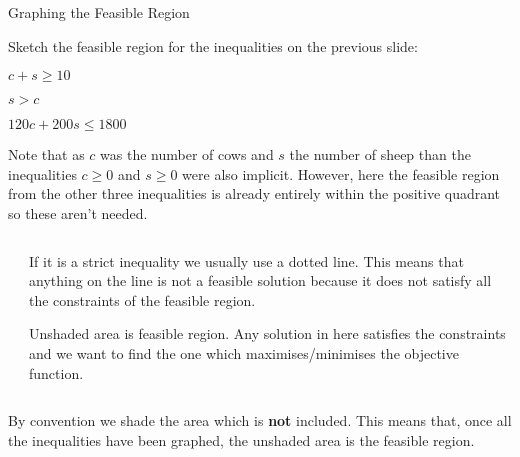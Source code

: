 \documentclass[8pt]{beamer}
\begin{document}
\begin{frame}{Graphing the Feasible Region}
	\begin{problem}
		Sketch the feasible region for the inequalities on the previous slide:
		\begin{minipage}{.3\linewidth}
		$c+s \geq 10$

		 $s > c$

		  $120c+200s \leq 1800$
		\end{minipage}%
		\begin{minipage}{.7\linewidth}
			\alert{Note that as $c$ was the number of cows and $s$ the number of sheep than the inequalities $c \geq 0 $ and $s \geq 0$ were also implicit. However, here the feasible region from the other three inequalities is already entirely within the positive quadrant so these aren't needed.}
		\end{minipage}
	\end{problem}
	\begin{columns}
	\begin{column}{.5\linewidth}
				\begin{center}
\end{center}
\end{column}
\begin{column}{.5\linewidth}
	\alert{If it is a strict inequality we
usually use a dotted line.
This means that anything on
the line is not a feasible
solution because it does not
satisfy all the constraints of
the feasible region.}

Unshaded area is feasible
region. Any solution in here
satisfies the constraints and
we want to find the one
which maximises/minimises
the objective function.
\end{column}
\end{columns}

\begin{definition}
	By convention we shade the area which is \textbf{not} included. This means that, once all the inequalities have been graphed, the unshaded area is the feasible region.
\end{definition}
\end{frame}
\end{document}
